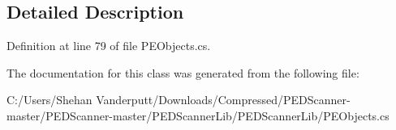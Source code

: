 \subsection{Detailed Description}


Definition at line 79 of file P\+E\+Objects.\+cs.



The documentation for this class was generated from the following file\+:\begin{DoxyCompactItemize}
\item 
C\+:/\+Users/\+Shehan Vanderputt/\+Downloads/\+Compressed/\+P\+E\+D\+Scanner-\/master/\+P\+E\+D\+Scanner-\/master/\+P\+E\+D\+Scanner\+Lib/\+P\+E\+D\+Scanner\+Lib/P\+E\+Objects.\+cs\end{DoxyCompactItemize}
